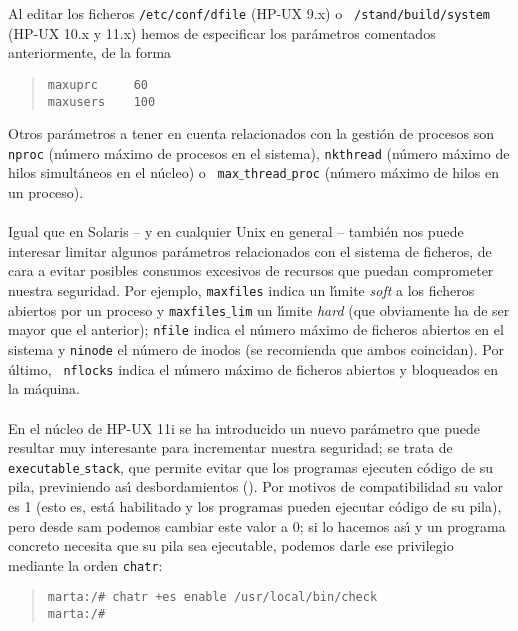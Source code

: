 Al editar los ficheros {\tt /etc/conf/dfile} (HP-UX 9.x) o {\tt 
/stand/build/system} (HP-UX 10.x y 11.x) hemos de especificar los par\'ametros 
comentados anteriormente, de la forma
\begin{quote}
\begin{verbatim}
maxuprc     60
maxusers    100
\end{verbatim}
\end{quote}
Otros par\'ametros a tener en cuenta relacionados con la gesti\'on de procesos
son {\tt nproc} (n\'umero m\'aximo de procesos en el sistema), {\tt nkthread}
(n\'umero m\'aximo de hilos simult\'aneos en el n\'ucleo) o {\tt 
max$\_$thread$\_$proc} (n\'umero m\'aximo de hilos en un proceso).\\ 
\\Igual que en Solaris -- y en cualquier Unix en general -- tambi\'en nos puede
interesar limitar algunos par\'ametros relacionados con el sistema de ficheros,
de cara a evitar posibles consumos excesivos de recursos que puedan comprometer
nuestra seguridad. Por ejemplo, {\tt maxfiles} indica un l\'{\i}mite {\it soft}
a los ficheros abiertos por un proceso y {\tt maxfiles$\_$lim} un l\'{\i}mite
{\it hard} (que obviamente ha de ser mayor que el anterior); {\tt nfile} 
indica el n\'umero m\'aximo de ficheros abiertos en el sistema y {\tt ninode}
el n\'umero de inodos (se recomienda que ambos coincidan). Por \'ultimo, {\tt 
nflocks} indica el n\'umero m\'aximo de ficheros abiertos y bloqueados en la 
m\'aquina.\\
\\En el n\'ucleo de HP-UX 11i se ha introducido un nuevo par\'ametro que puede
resultar muy interesante para incrementar nuestra seguridad; se trata de {\tt 
executable$\_$stack}, que permite evitar que los programas ejecuten c\'odigo de
su pila, previniendo as\'{\i} desbordamientos (\cite{kn:hp00}). Por motivos de 
compatibilidad
su valor es 1 (esto es, est\'a habilitado y los programas pueden ejecutar 
c\'odigo de su pila), pero desde {\sc sam} podemos cambiar este valor a 0; si
lo hacemos as\'{\i} y un programa concreto necesita que su pila sea ejecutable,
podemos darle ese privilegio mediante la orden {\tt chatr}:
\begin{quote}
\begin{verbatim}
marta:/# chatr +es enable /usr/local/bin/check
marta:/# 
\end{verbatim}
\end{quote}
